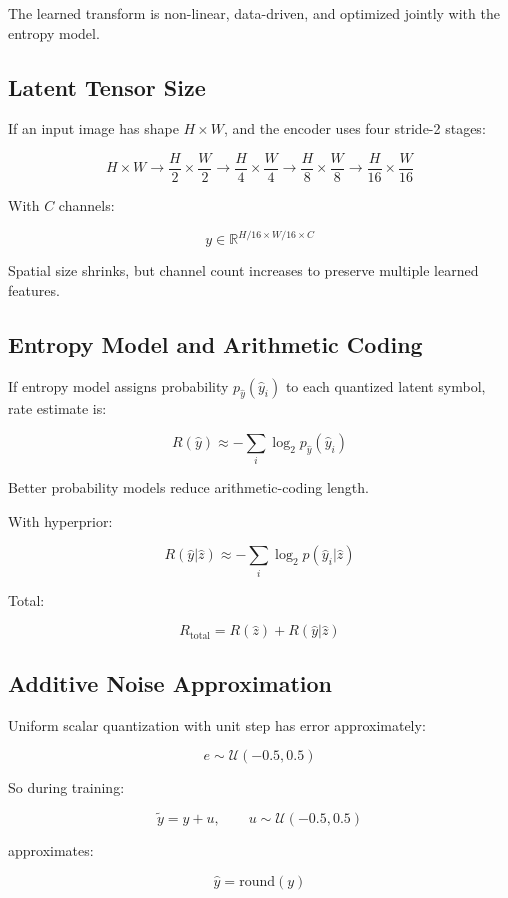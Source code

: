 The learned transform is non-linear, data-driven, and optimized jointly with the entropy model.

\subsection{Latent Tensor Size}

If an input image has shape $H\times W$, and the encoder uses four stride-2 stages:

\[
H\times W
\rightarrow
\frac{H}{2}\times\frac{W}{2}
\rightarrow
\frac{H}{4}\times\frac{W}{4}
\rightarrow
\frac{H}{8}\times\frac{W}{8}
\rightarrow
\frac{H}{16}\times\frac{W}{16}
\]

With $C$ channels:

\[
y\in\mathbb{R}^{H/16\times W/16\times C}
\]

Spatial size shrinks, but channel count increases to preserve multiple learned features.

\subsection{Entropy Model and Arithmetic Coding}

If entropy model assigns probability $p_{\hat{y}}(\hat{y}_i)$ to each quantized latent symbol, rate estimate is:

\[
R(\hat{y})\approx
-\sum_i \log_2 p_{\hat{y}}(\hat{y}_i)
\]

Better probability models reduce arithmetic-coding length.

With hyperprior:

\[
R(\hat{y}|\hat{z})
\approx
-\sum_i\log_2 p(\hat{y}_i|\hat{z})
\]

Total:

\[
R_{\text{total}}
=
R(\hat{z})+R(\hat{y}|\hat{z})
\]

\subsection{Additive Noise Approximation}

Uniform scalar quantization with unit step has error approximately:

\[
e\sim\mathcal{U}(-0.5,0.5)
\]

So during training:

\[
\tilde{y}=y+u,\qquad u\sim\mathcal{U}(-0.5,0.5)
\]

approximates:

\[
\hat{y}=\mathrm{round}(y)
\]

